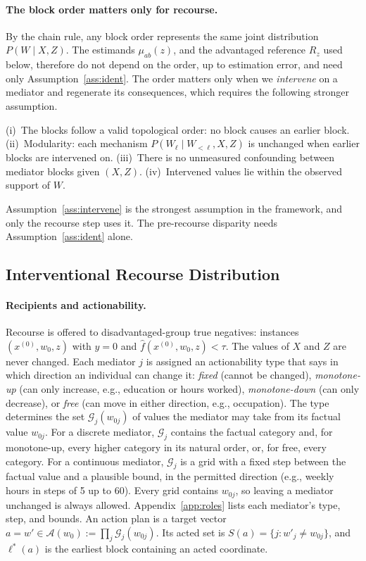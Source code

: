 \paragraph{The block order matters only for recourse.}
By the chain rule, any block order represents the same joint distribution
$P(W\mid X,Z)$. The estimands $\mu_{ab}(z)$, and the advantaged reference
$R_z$ used below, therefore do not depend on the order, up to estimation
error, and need only Assumption~\ref{ass:ident}. The order matters only when
we \emph{intervene} on a mediator and regenerate its consequences, which
requires the following stronger assumption.

\begin{assumption}
\label{ass:intervene}
(i)~The blocks follow a valid topological order: no block causes an earlier
block.
(ii)~Modularity: each mechanism $P(W_\ell\mid W_{<\ell},X,Z)$ is unchanged when
earlier blocks are intervened on.
(iii)~There is no unmeasured confounding between mediator blocks given
$(X,Z)$.
(iv)~Intervened values lie within the observed support of $W$.
\end{assumption}

\noindent Assumption~\ref{ass:intervene} is the strongest assumption in the
framework, and only the recourse step uses it. The pre-recourse disparity
needs Assumption~\ref{ass:ident} alone.

\subsection{Interventional Recourse Distribution}
\label{sec:intervention}

\paragraph{Recipients and actionability.}
Recourse is offered to disadvantaged-group true negatives: instances
$(x^{(0)},w_0,z)$ with $y=0$ and $\hat f(x^{(0)},w_0,z)<\tau$. The values of $X$
and $Z$ are never changed. Each mediator $j$ is assigned an actionability type
that says in which direction an individual can change it:
\emph{fixed} (cannot be changed), \emph{monotone-up} (can only increase, e.g.,
education or hours worked), \emph{monotone-down} (can only decrease), or
\emph{free} (can move in either direction, e.g., occupation). The type
determines the set $\mathcal G_j(w_{0j})$ of values the mediator may take from
its factual value $w_{0j}$. For a discrete mediator, $\mathcal G_j$ contains
the factual category and, for monotone-up, every higher category in its
natural order, or, for free, every category. For a continuous mediator,
$\mathcal G_j$ is a grid with a fixed step between the factual value and a
plausible bound, in the permitted direction (e.g., weekly hours in steps of
5 up to 60). Every grid contains $w_{0j}$, so leaving a mediator unchanged is
always allowed. Appendix~\ref{app:roles} lists each mediator's type, step,
and bounds. An action plan is a target vector
$a=w'\in\mathcal A(w_0):=\prod_j\mathcal G_j(w_{0j})$. Its acted set is
$S(a)=\{j:w'_j\ne w_{0j}\}$, and $\ell^*(a)$ is the earliest block containing
an acted coordinate.

